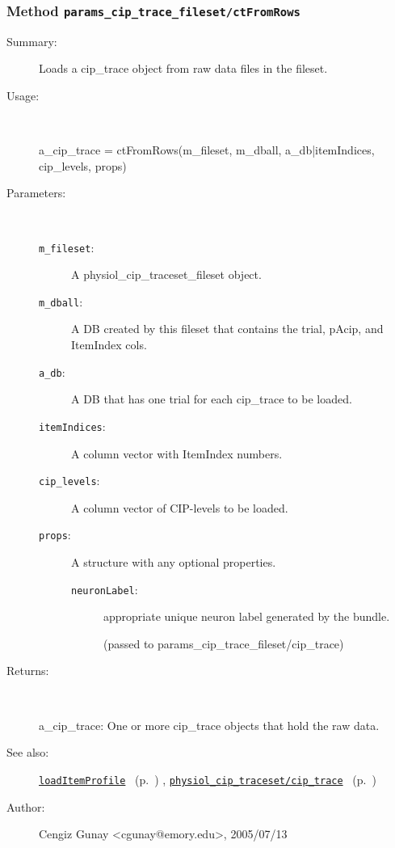 \subsubsection[Method \texttt{ctFromRows}]{Method \texttt{params\_cip\_trace\_fileset/ctFromRows}}%
%
\label{ref_params_cip_trace_fileset__ctFromRows}%
\hypertarget{ref_params_cip_trace_fileset__ctFromRows}{}%
\begin{description}
\item[Summary:]Loads a cip\_trace object from raw data files in the fileset.
%
\item[Usage:]~%
\begin{lyxcode}%
a\_cip\_trace = ctFromRows(m\_fileset, m\_dball, a\_db|itemIndices, cip\_levels, props)
%
\end{lyxcode}%
%
%
\item[Parameters:]~
\begin{description}%
\item[\texttt{m\_fileset}:]
 A physiol\_cip\_traceset\_fileset object.
\item[\texttt{m\_dball}:]
 A DB created by this fileset that contains the trial, pAcip, and ItemIndex cols.
\item[\texttt{a\_db}:]
 A DB that has one trial for each cip\_trace to be loaded.
\item[\texttt{itemIndices}:]
 A column vector with ItemIndex numbers.
\item[\texttt{cip\_levels}:]
 A column vector of CIP-levels to be loaded.
\item[\texttt{props}:]
 A structure with any optional properties.
\begin{description}%
\item[\texttt{neuronLabel}:]
 appropriate unique neuron label generated by the bundle.

(passed to params\_cip\_trace\_fileset/cip\_trace)\end{description}%
\end{description}%
%
\item[Returns:]~

	a\_cip\_trace: One or more cip\_trace objects that hold the raw data.
%
%
\item[See also:]%
\hyperlink{ref_loadItemProfile}{\texttt{loadItemProfile}}%
\ (p.~\pageref{ref_loadItemProfile})%
%
, \hyperlink{ref_physiol_cip_traceset__cip_trace}{\texttt{physiol\_cip\_traceset/cip\_trace}}%
\ (p.~\pageref{ref_physiol_cip_traceset__cip_trace})%
%
%
\item[Author:]%
Cengiz Gunay <cgunay@emory.edu>, 2005/07/13%
\end{description}
\methodline%
